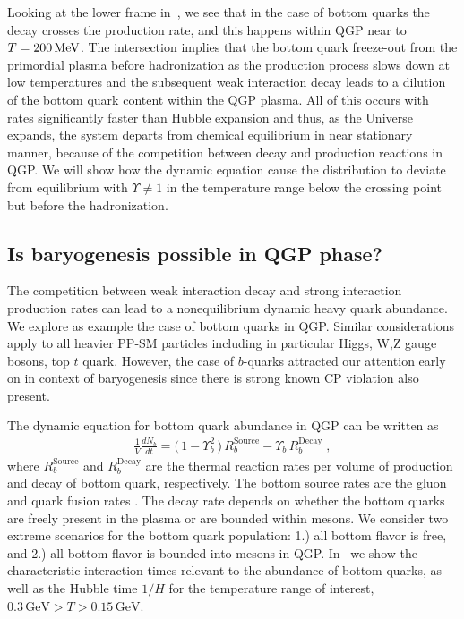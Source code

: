 Looking at the lower frame in~, we see that in the case of bottom quarks the decay crosses the production rate, and this happens within QGP near to $T=200\text{\,MeV}$. The intersection implies that the bottom quark freeze-out from the primordial plasma before hadronization as the production process slows down at low temperatures and the subsequent weak interaction decay leads to a dilution of the bottom quark content within the QGP plasma. All of this occurs with rates significantly faster than Hubble expansion and thus, as the Universe expands, the system departs from chemical equilibrium in near stationary manner, because of the competition between decay and production reactions in QGP. We will show how the dynamic equation cause the distribution to deviate from equilibrium with $\Upsilon\neq1$ in the temperature range below the crossing point but before the hadronization. 

\subsection{Is baryogenesis possible in QGP phase?}\label{Bottom}
The competition between weak interaction decay and strong interaction production rates can lead to a nonequilibrium dynamic heavy quark abundance. We explore as example the case of bottom quarks in QGP. Similar considerations apply to all heavier PP-SM particles including in particular Higgs, W,Z gauge bosons, top $t$ quark. However, the case of $b$-quarks attracted our attention early on in context of baryogenesis since there is strong known CP violation also present.
 
The dynamic equation for bottom quark abundance in QGP can be written as 
\begin{align}
\label{Bquark_eq}
\frac{1}{V}\frac{dN_b}{dt}=\big(\,1-\Upsilon^2_{b}\,\big)\,R^{\mathrm{Source}}_{b}-\Upsilon_b\,R^{\mathrm{Decay}}_{b}\;,
\end{align}
where $R^{\mathrm{Source}}_{b}$ and $R^{\mathrm{Decay}}_{b}$ are the thermal reaction rates per volume of production and decay of bottom quark, respectively. The bottom source rates are the gluon and quark fusion rates . The decay rate depends on whether the bottom quarks are freely present in the plasma or are bounded within mesons. We consider two extreme scenarios for the bottom quark population: 1.) all bottom flavor is free, and 2.) all bottom flavor is bounded into mesons in QGP. In~ we show the characteristic interaction times relevant to the abundance of bottom quarks, as well as the Hubble time $1/H$ for the temperature range of interest, $0.3\,\mathrm{GeV}> T> 0.15\,\mathrm{GeV}$.

